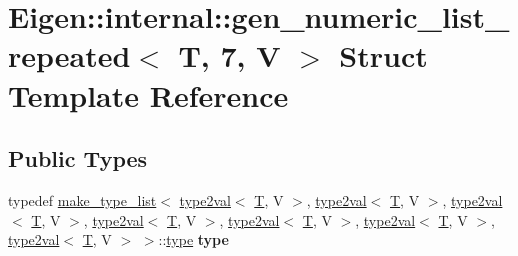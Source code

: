 \hypertarget{struct_eigen_1_1internal_1_1gen__numeric__list__repeated_3_01_t_00_017_00_01_v_01_4}{}\section{Eigen\+:\+:internal\+:\+:gen\+\_\+numeric\+\_\+list\+\_\+repeated$<$ T, 7, V $>$ Struct Template Reference}
\label{struct_eigen_1_1internal_1_1gen__numeric__list__repeated_3_01_t_00_017_00_01_v_01_4}
\subsection*{Public Types}
\begin{DoxyCompactItemize}
\item 
\mbox{\label{struct_eigen_1_1internal_1_1gen__numeric__list__repeated_3_01_t_00_017_00_01_v_01_4_a0ee55c9673ba4667c9675fa76b21d297}} 
typedef \hyperlink{struct_eigen_1_1internal_1_1make__type__list}{make\+\_\+type\+\_\+list}$<$ \hyperlink{struct_eigen_1_1internal_1_1type2val}{type2val}$<$ \hyperlink{group___sparse_core___module}{T}, V $>$, \hyperlink{struct_eigen_1_1internal_1_1type2val}{type2val}$<$ \hyperlink{group___sparse_core___module}{T}, V $>$, \hyperlink{struct_eigen_1_1internal_1_1type2val}{type2val}$<$ \hyperlink{group___sparse_core___module}{T}, V $>$, \hyperlink{struct_eigen_1_1internal_1_1type2val}{type2val}$<$ \hyperlink{group___sparse_core___module}{T}, V $>$, \hyperlink{struct_eigen_1_1internal_1_1type2val}{type2val}$<$ \hyperlink{group___sparse_core___module}{T}, V $>$, \hyperlink{struct_eigen_1_1internal_1_1type2val}{type2val}$<$ \hyperlink{group___sparse_core___module}{T}, V $>$, \hyperlink{struct_eigen_1_1internal_1_1type2val}{type2val}$<$ \hyperlink{group___sparse_core___module}{T}, V $>$ $>$\+::\hyperlink{struct_eigen_1_1internal_1_1type__list}{type} {\bfseries type}
\item 
\mbox{\label{struct_eigen_1_1internal_1_1gen__numeric__list__repeated_3_01_t_00_017_00_01_v_01_4_a0ee55c9673ba4667c9675fa76b21d297}} 

\end{DoxyCompactItemize}
